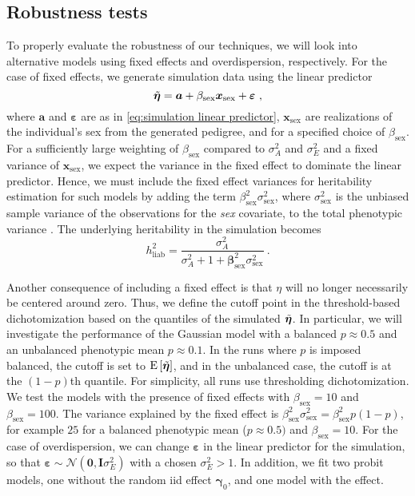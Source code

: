 \subsection{Robustness tests}
\label{sec:method:robustness}
To properly evaluate the robustness of our techniques, we will look into alternative models using fixed effects and overdispersion, respectively. For the case of fixed effects, we generate simulation data using the linear predictor
\begin{equation}
\Tilde{\bm \eta} = \bm a + \beta_\text{sex} \bm x_{\text{sex}} + \bm \varepsilon \ ,
\end{equation}
where $\bm a$ and $\bm \varepsilon$ are as in \eqref{eq:simulation linear predictor}, $\bm x_{\text{sex}}$ are realizations of the individual's sex from the generated pedigree, and for a specified choice of $\beta_\text{sex}$. For a sufficiently large weighting of $\beta_\text{sex}$ compared to $\sigma^2_A$ and $\sigma^2_E$ and a fixed variance of $\bm x_\text{sex}$, we expect the variance in the fixed effect to dominate the linear predictor. Hence, we must include the fixed effect variances for heritability estimation for such models by adding the term $\beta_\text{sex}^2 \sigma^2_{\text{sex}}$, where $\sigma^2_{\text{sex}}$ is the unbiased sample variance of the observations for the \textit{sex} covariate, to the total phenotypic variance \autocite{nakagawa2013general}. The underlying heritability in the simulation becomes
\begin{equation}
    h^2_\text{liab} = \frac{\sigma^2_A}{\sigma^2_A+1+\bm\beta^2_\text{sex}\sigma^2_{\text{sex}}} \ .
\end{equation}

Another consequence of including a fixed effect is that $\eta$ will no longer necessarily be centered around zero. Thus, we define the cutoff point in the threshold-based dichotomization based on the quantiles of the simulated $\Tilde{\bm\eta}$. In particular, we will investigate the performance of the Gaussian model with a balanced $p\approx 0.5$ and an unbalanced phenotypic mean $p\approx 0.1$. In the runs where $p$ is imposed balanced, the cutoff is set to $\operatorname{E}\left[\Tilde{\bm\eta}\right]$, and in the unbalanced case, the cutoff is at the $(1-p)$th quantile. For simplicity, all runs use thresholding dichotomization.
We test the models with the presence of fixed effects with $\beta_\text{sex} = 10$ and $\beta_\text{sex}=100$. The variance explained by the fixed effect is $\beta_\text{sex}^2\sigma^2_\text{sex}=\beta_\text{sex}^2 p(1-p)$, for example $25$ for a balanced phenotypic mean ($p \approx 0.5)$ and $\beta_\text{sex}=10$.
For the case of overdispersion, we can change $\bm\varepsilon$ in the linear predictor for the simulation, so that $\bm\varepsilon \sim \mathcal{N}(\bm 0, \bm I \sigma^2_E)$ with a chosen $\sigma^2_E > 1$. In addition, we fit two probit models, one without the random iid effect $\bm\gamma_0$, and one model with the effect.

